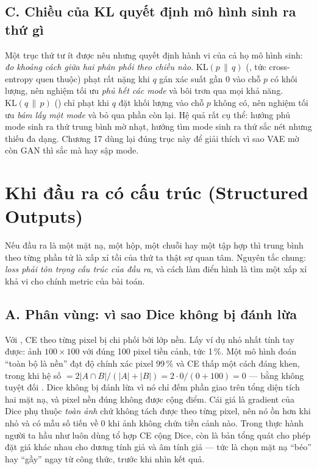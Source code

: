\documentclass[../../deep_learning.tex]{subfiles}
\begin{document}
\subsection{C. Chiều của KL quyết định mô hình sinh ra thứ gì}

Một trục thứ tư ít được nêu nhưng quyết định hành vi của cả họ mô hình sinh: \emph{đo khoảng cách giữa hai phân phối theo chiều nào}. \(\mathrm{KL}(p\,\|\,q)\) (, tức cross-entropy quen thuộc) phạt rất nặng khi \(q\) gán xác suất gần 0 vào chỗ \(p\) có khối lượng, nên nghiệm tối ưu \emph{phủ hết các mode} và bôi trơn qua mọi khả năng. \(\mathrm{KL}(q\,\|\,p)\) () chỉ phạt khi \(q\) đặt khối lượng vào chỗ \(p\) không có, nên nghiệm tối ưu \emph{bám lấy một mode} và bỏ qua phần còn lại. Hệ quả rất cụ thể: hướng phủ mode sinh ra thứ trung bình mờ nhạt, hướng tìm mode sinh ra thứ sắc nét nhưng thiếu đa dạng. Chương 17 dùng lại đúng trục này để giải thích vì sao VAE mờ còn GAN thì sắc mà hay sập mode.

\section{Khi đầu ra có cấu trúc (Structured Outputs)}

Nếu đầu ra là một mặt nạ, một hộp, một chuỗi hay một tập hợp thì trung bình theo từng phần tử là xấp xỉ tồi của thứ ta thật sự quan tâm. Nguyên tắc chung: \emph{loss phải tôn trọng cấu trúc của đầu ra}, và cách làm điển hình là tìm một xấp xỉ khả vi cho chính metric của bài toán.

\subsection{A. Phân vùng: vì sao Dice không bị đánh lừa}

Với , CE theo từng pixel bị chi phối bởi lớp nền. Lấy ví dụ nhỏ nhất tính tay được: ảnh \(100\times100\) với đúng 100 pixel tiền cảnh, tức 1\,\%. Một mô hình đoán ``toàn bộ là nền'' đạt độ chính xác pixel 99\,\% và CE thấp một cách đáng khen, trong khi hệ số  \(= 2|A\cap B| / (|A|+|B|) = 2\cdot 0/(0+100) = 0\) --- bằng không tuyệt đối \cite{milletari2016vnet}. Dice không bị đánh lừa vì nó chỉ đếm phần giao trên tổng diện tích hai mặt nạ, và pixel nền đúng không được cộng điểm. Cái giá là gradient của Dice phụ thuộc \emph{toàn ảnh} chứ không tách được theo từng pixel, nên nó ồn hơn khi  nhỏ và có mẫu số tiến về 0 khi ảnh không chứa tiền cảnh nào. Trong thực hành người ta hầu như luôn dùng tổ hợp CE cộng Dice, còn  là bản tổng quát cho phép đặt giá khác nhau cho dương tính giả và âm tính giả --- tức là chọn mặt nạ ``béo'' hay ``gầy'' ngay từ công thức, trước khi nhìn kết quả.
\end{document}

